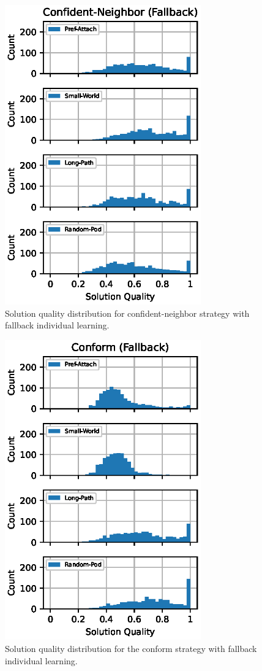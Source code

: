 \begin{figure}
    \centering
    \includegraphics[width=3.33in]{chapters/figures/NetDelibABM/results-cn-fallback-dist.eps}
	\caption{Solution quality distribution for confident-neighbor strategy with fallback individual learning.}
    \label{fig:results-cn-fallback-dist}
\end{figure}

\begin{figure}
    \centering
    \includegraphics[width=3.33in]{chapters/figures/NetDelibABM/results-conf-fallback-dist.eps}
	\caption{Solution quality distribution for the conform strategy with fallback individual learning.}
    \label{fig:results-conf-fallback-dist}
\end{figure}

